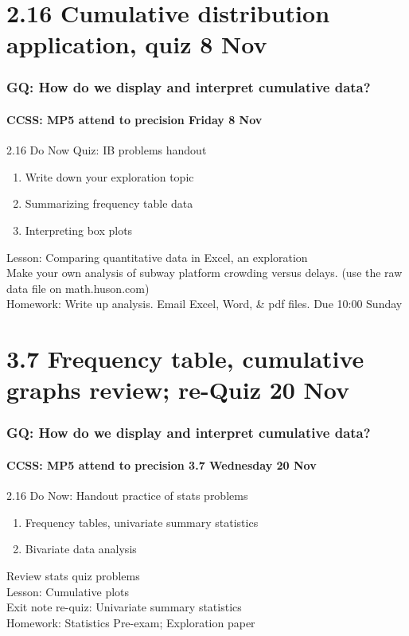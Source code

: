 \documentclass{beamer}
\begin{document}
\section{2.16 Cumulative distribution application, quiz 8 Nov}
\frame
{
  \frametitle{GQ: How do we display and interpret cumulative data?}
  \framesubtitle{CCSS: MP5 attend to precision \hfill \alert{Friday 8 Nov}}

  \begin{block}{2.16 Do Now Quiz: IB problems handout}
  \begin{enumerate}
      \item Write down your exploration topic 
      \item Summarizing frequency table data
      \item Interpreting box plots
  \end{enumerate}
  \end{block}
  Lesson: Comparing quantitative data in Excel, an exploration\\
  Make your own analysis of subway platform crowding versus delays. (use the raw data file on math.huson.com) \\ \smallskip
  Homework: Write up analysis. Email Excel, Word, \& pdf files. Due 10:00 Sunday
}


\section{3.7 Frequency table, cumulative graphs review; re-Quiz 20 Nov}
\frame
{
  \frametitle{GQ: How do we display and interpret cumulative data?}
  \framesubtitle{CCSS: MP5 attend to precision \hfill \alert{3.7 Wednesday 20 Nov}}

  \begin{block}{2.16 Do Now: Handout practice of stats problems}
  \begin{enumerate}
      \item Frequency tables, univariate summary statistics
      \item Bivariate data analysis
  \end{enumerate}
  \end{block}
  Review stats quiz problems \\
  Lesson: Cumulative plots \\ \smallskip
  Exit note re-quiz: Univariate summary statistics \\ \smallskip
  Homework: Statistics Pre-exam; Exploration paper
}
\end{document}
